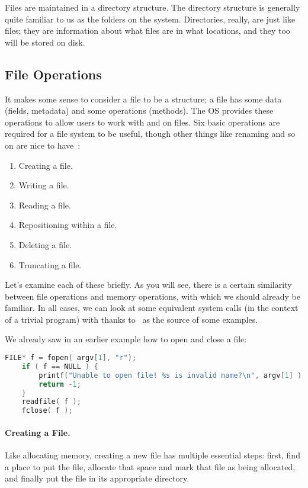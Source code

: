 Files are maintained in a directory structure. The directory structure is generally quite familiar to us as the folders on the system. Directories, really, are just like files; they are information about what files are in what locations, and they too will be stored on disk.

\subsection*{File Operations}
It makes some sense to consider a file to be a structure; a file has some data (fields, metadata) and some operations (methods). The OS provides these operations to allow users to work with and on files. Six basic operations are required for a file system to be useful, though other things like renaming and so on are nice to have~\cite{osc}:

\begin{enumerate}
	\item Creating a file.
	\item Writing a file.
	\item Reading a file.
	\item Repositioning within a file.
	\item Deleting a file.
	\item Truncating a file.
\end{enumerate}

Let's examine each of these briefly. As you will see, there is a certain similarity between file operations and memory operations, with which we should already be familiar. In all cases, we can look at some equivalent system calls (in the context of a trivial program) with thanks to~\cite{cfiles} as the source of some examples.

We already saw in an earlier example how to open and close a file:
\begin{lstlisting}[language=C]
    FILE* f = fopen( argv[1], "r");
    if ( f == NULL ) {
        printf("Unable to open file! %s is invalid name?\n", argv[1] );
        return -1;
    }
    readfile( f );
    fclose( f );
\end{lstlisting}

\paragraph{Creating a File.} Like allocating memory, creating a new file has multiple essential steps: first, find a place to put the file, allocate that space and mark that file as being allocated, and finally put the file in its appropriate directory.

